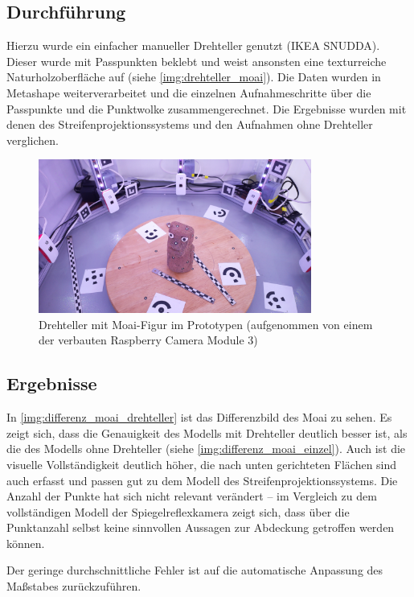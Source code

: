 \documentclass[./00PhotoBox.tex]{subfiles}
\begin{document}
\subsection{Durchführung}
Hierzu wurde ein einfacher manueller Drehteller genutzt (IKEA SNUDDA). Dieser wurde mit Passpunkten beklebt und weist ansonsten eine texturreiche Naturholzoberfläche auf (siehe \autoref{img:drehteller_moai}). Die Daten wurden in Metashape weiterverarbeitet und die einzelnen Aufnahmeschritte über die Passpunkte und die Punktwolke zusammengerechnet. Die Ergebnisse wurden mit denen des Streifenprojektionssystems und den Aufnahmen ohne Drehteller verglichen.

\begin{figure}
    \centering
    \includegraphics[width=0.8\textwidth]{img/7_versuche/drehteller_moai.jpg}
    \caption{Drehteller mit Moai-Figur im Prototypen (aufgenommen von einem der verbauten Raspberry Camera Module 3)}
    \label{img:drehteller_moai}
\end{figure}

\subsection{Ergebnisse}

In \autoref{img:differenz_moai_drehteller} ist das Differenzbild des Moai zu sehen. Es zeigt sich, dass die Genauigkeit des Modells mit Drehteller deutlich besser ist, als die des Modells ohne Drehteller (siehe \autoref{img:differenz_moai_einzel}). Auch ist die visuelle Vollständigkeit deutlich höher, die nach unten gerichteten Flächen sind auch erfasst und passen gut zu dem Modell des Streifenprojektionssystems. Die Anzahl der Punkte hat sich nicht relevant verändert -- im Vergleich zu dem vollständigen Modell der Spiegelreflexkamera zeigt sich, dass über die Punktanzahl selbst keine sinnvollen Aussagen zur Abdeckung getroffen werden können.

Der geringe durchschnittliche Fehler ist auf die au\-to\-ma\-tische Anpassung des Maßstabes zurückzuführen.
\end{document}
